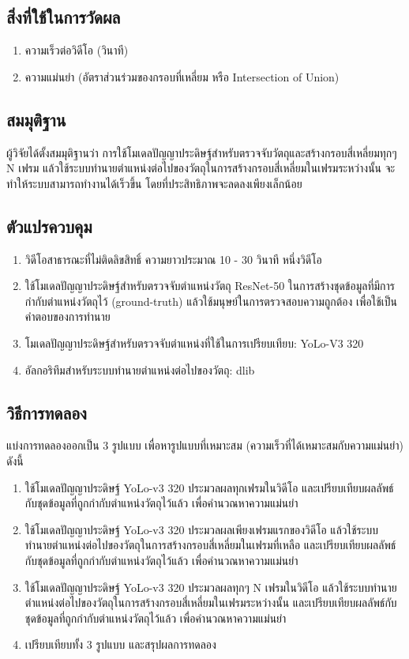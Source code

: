 \subsection*{สิ่งที่ใช้ในการวัดผล}
	\begin{enumerate}
		\item ความเร็วต่อวิดีโอ (วินาที)
		\item ความแม่นยำ (อัตราส่วนร่วมของกรอบที่เหลี่ยม หรือ Intersection of Union)
	\end{enumerate}
\subsection*{สมมุติฐาน}
ผู้วิจัยได้ตั้งสมมุติฐานว่า การใช้โมเดลปัญญาประดิษฐ์สำหรับตรวจจับวัตถุและสร้างกรอบสี่เหลี่ยมทุกๆ N เฟรม 
แล้วใช้ระบบทำนายตำแหน่งต่อไปของวัตถุในการสร้างกรอบสี่เหลี่ยมในเฟรมระหว่างนั้น จะทำให้ระบบสามารถทำงานได้เร็วขึ้น โดยที่ประสิทธิภาพจะลดลงเพียงเล็กน้อย
\subsection*{ตัวแปรควบคุม}
	\begin{enumerate}
		\item วิดีโอสาธารณะที่ไม่ติดลิขสิทธิ์ ความยาวประมาณ 10 - 30 วินาที หนึ่งวิดีโอ
		\item ใช้โมเดลปัญญาประดิษฐ์สำหรับตรวจจับตำแหน่งวัตถุ ResNet-50 ในการสร้างชุดข้อมูลที่มีการกำกับตำแหน่งวัตถุไว้ (ground-truth) แล้วใช้มนุษย์ในการตรวจสอบความถูกต้อง
		เพื่อใช้เป็นคำตอบของการทำนาย
		\item โมเดลปัญญาประดิษฐ์สำหรับตรวจจับตำแหน่งที่ใช้ในการเปรียบเทียบ: YoLo-V3 320
		\item อัลกอริทึมสำหรับระบบทำนายตำแหน่งต่อไปของวัตถุ: dlib
	\end{enumerate}
\subsection*{วิธีการทดลอง}
แบ่งการทดลองออกเป็น 3 รูปแบบ เพื่อหารูปแบบที่เหมาะสม (ความเร็วที่ได้เหมาะสมกับความแม่นยำ) ดังนี้
	\begin{enumerate}
		\item ใช้โมเดลปัญญาประดิษฐ์ YoLo-v3 320 ประมวลผลทุกเฟรมในวิดีโอ และเปรียบเทียบผลลัพธ์กับชุดข้อมูลที่ถูกกำกับตำแหน่งวัตถุไว้แล้ว เพื่อคำนวณหาความแม่นยำ
		\item ใช้โมเดลปัญญาประดิษฐ์ YoLo-v3 320 ประมวลผลเพียงเฟรมแรกของวิดีโอ แล้วใช้ระบบทำนายตำแหน่งต่อไปของวัตถุในการสร้างกรอบสี่เหลี่ยมในเฟรมที่เหลือ 
		และเปรียบเทียบผลลัพธ์กับชุดข้อมูลที่ถูกกำกับตำแหน่งวัตถุไว้แล้ว เพื่อคำนวณหาความแม่นยำ
		\item ใช้โมเดลปัญญาประดิษฐ์ YoLo-v3 320 ประมวลผลทุกๆ N เฟรมในวิดีโอ แล้วใช้ระบบทำนายตำแหน่งต่อไปของวัตถุในการสร้างกรอบสี่เหลี่ยมในเฟรมระหว่างนั้น 
		และเปรียบเทียบผลลัพธ์กับชุดข้อมูลที่ถูกกำกับตำแหน่งวัตถุไว้แล้ว เพื่อคำนวณหาความแม่นยำ
		\item เปรียบเทียบทั้ง 3 รูปแบบ และสรุปผลการทดลอง
\end{enumerate}